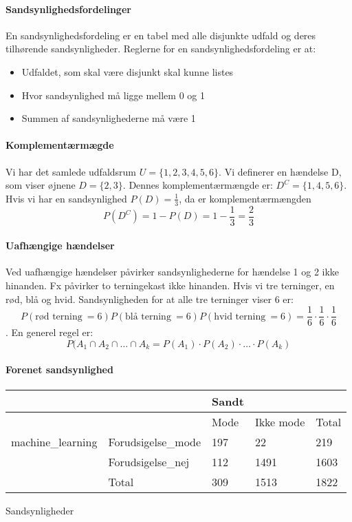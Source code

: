 \documentclass{article}
\begin{document}
\paragraph{Sandsynlighedsfordelinger}
En sandsynlighedsfordeling er en tabel med alle disjunkte udfald og deres
tilhørende sandsynligheder. Reglerne for en sandsynlighedsfordeling er at:
\begin{itemize}
  \item Udfaldet, som skal være disjunkt skal kunne listes
  \item Hvor sandsynlighed må ligge mellem 0 og 1
  \item Summen af sandsynlighederne må være 1
\end{itemize}

\paragraph{Komplementærmægde}
Vi har det samlede udfaldsrum $U = \{1, 2, 3,4,5,6\}$.  Vi definerer en hændelse
D, som viser øjnene $D = \{2,3\}$. Dennes komplementærmængde er: $D^{C} =
\{1,4,5,6\}$. Hvis vi har en sandsynlighed $P(D) = \frac{1}{3}$, da er
komplementærmængden $$P(D^C) = 1 - P(D) = 1 - \frac{1}{3} = \frac{2}{3}$$

\paragraph{Uafhængige hændelser}
Ved uafhængige hændelser påvirker sandsynlighederne for hændelse 1 og 2 ikke
hinanden. Fx påvirker to terningekast ikke hinanden. Hvis vi tre terninger, en
rød, blå og hvid. Sandsynligheden for at alle tre terninger viser 6 er:
$$P(\text{rød terning} \ =6)P(\text{blå terning} \ =6)P(\text{hvid terning} \
=6) = \frac{1}{6}\cdot \frac{1}{6} \cdot\frac{1}{6}$$.
En generel regel er:
$$P(A_1 \cap A_2 \cap \dots \cap A_k = P(A_1) \cdot P(A_2) \cdot \dots \cdot
P(A_k) $$

\paragraph{Forenet sandsynlighed}
\begin{table}[H]
  \centering
  \begin{tabular}{l|l|l|l|l}
   &                    & Sandt  &           &        \\\hline
   &                                       & Mode   & Ikke mode & Total  \\\hline
   machine\_learning & Forudsigelse\_mode & 197 & 22    & 219 \\\hline
   & Forudsigelse\_nej  & 112 & 1491    & 1603 \\\hline
   & Total              & 309 & 1513    & 1822   
  \end{tabular}
\end{table}
Sandsynligheder
\end{document}
